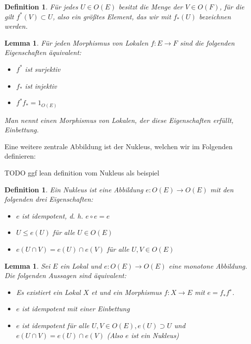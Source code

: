 \documentclass{article}
\newtheorem{lemma}[satz]{Lemma}
\newtheorem{definition}[satz]{Definition}
\begin{document}
\begin{definition}
    Für jedes $U\in O(E)$ besitzt die Menge der $V\in O(F)$, für die gilt $f^*(V)\subset U$, also ein größtes Element, das wir mit $f_*(U)$ bezeichnen werden.
\end{definition}

\begin{lemma}
    Für jeden Morphismus von Lokalen $f:E\to F$ sind die folgenden Eigenschaften äquivalent:
    \begin{itemize}
\item $f^*$ ist surjektiv  
\item  $f_*$ ist injektiv  
\item $f^* f_*=1_{O(E)}$ 
\end{itemize}
Man nennt einen Morphismus von Lokalen, der diese Eigenschaften erfüllt, Einbettung.
\end{lemma}
Eine weitere zentrale Abbildung ist der Nukleus, welchen wir im Folgenden definieren:

 TODO ggf lean definition vom Nukleus als beispiel
\begin{definition}\label{def:nukleus}
    Ein Nukleus \autocite[S. 485]{mac_lane_sheaves_1994} ist eine Abbildung $e:O(E)\to O(E)$ mit den folgenden drei Eigenschaften:
    \begin{itemize}
        \item $e$ ist idempotent, d. h. $e\circ e=e$
        \item $U\leq e(U)$ für alle $U\in O(E)$
        \item $e(U\cap V)=e(U)\cap e(V)$ für alle $U,V\in O(E)$
    \end{itemize}
\end{definition}


\begin{lemma}\label{lemma1}
Sei $E$ ein Lokal und $e:O(E)\to O(E)$ eine monotone Abbildung. Die folgenden Aussagen sind äquivalent:
\begin{itemize}
\item Es existiert ein Lokal $X$ et und ein Morphismus $f:X\to E$ mit $e = f_∗f^∗$.
\item $e$ ist idempotent mit einer Einbettung
\item $e$ ist idempotent für alle $U,V\in O(E), e(U)\supset U$ und $e(U\cap V)=e(U)\cap e(V)$ (Also $e$ ist ein Nukleus)
\end{itemize}
\autocite[S. 484]{mac_lane_sheaves_1994}
 \end{lemma}
\end{document}
